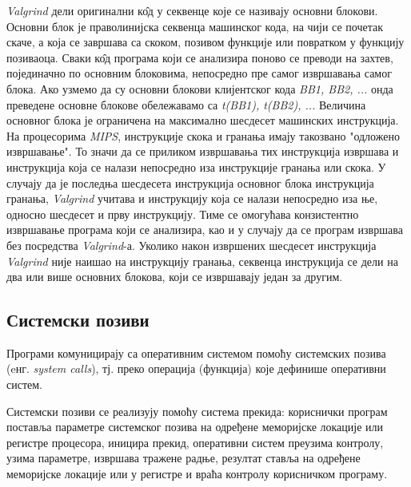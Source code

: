 \documentclass[12pt,oneside]{memoir}
\begin{document}
\indent \textit{Valgrind} дели оригинални к\^{о}д у секвенце које се називају основни блокови. Основни блок је праволинијска секвенца машинског кода, на чији се почетак скаче, а која се завршава са скоком, позивом функције или повратком у функцију позиваоца. Сваки к\^{о}д програма који се анализира поново се преводи на захтев, појединачно по основним блоковима, непосредно пре самог извршавања самог блока. Ако узмемо да су основни блокови клијентског кода \textit{BB1, BB2, ...} онда преведене основне блокове обележавамо са \textit{t(BB1), t(BB2), ...} Величина основног блока је ограничена на максимално шесдесет машинских инструкција. На процесорима \textit{MIPS}, инструкције скока и гранања имају такозвано "одложено извршавање". То значи да се приликом извршавања тих инструкција извршава и инструкција која се налази непосредно иза инструкције гранања или скока. У случају да је последња шесдесета инструкција основног блока инструкција гранања, \textit{Valgrind} учитава и инструкцију која се налази непосредно иза ње, односно шесдесет и прву инструкцију. Тиме се омогућава конзистентно извршавање програма који се анализира, као и у случају да се програм извршава без посредства \textit{Valgrind}-а. Уколико након извршених шесдесет инструкција \textit{Valgrind} није наишао на инструкцију гранања, секвенца инструкција се дели на два или више основних блокова, који се извршавају један за другим.



\subsection{Системски позиви}

\indent Програми комуницирају са оперативним системом помоћу системских позива (eнг. \textit{system calls}), тј. преко операција (функција) које дефинише оперативни систем.

\indent Системски позиви се реализују помоћу система прекида: кориснички програм поставља параметре системског позива на одређене меморијске локације или регистре процесора, иницира прекид, оперативни систем преузима контролу, узима параметре, извршава тражене радње, резултат ставља на одређене меморијске локације или у регистре и враћа контролу корисничком програму.
\end{document}
